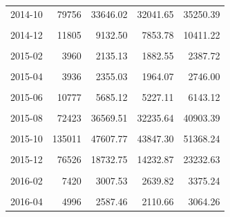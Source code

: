 \begin{longtable}[t]{crrrr}
2014-10 & 79756 & 33646.02 & 32041.65 & 35250.39\\
\cellcolor{gray!10}{2014-11} & \cellcolor{gray!10}{19109} & \cellcolor{gray!10}{15790.36} & \cellcolor{gray!10}{14187.10} & \cellcolor{gray!10}{17393.61}\\
2014-12 & 11805 & 9132.50 & 7853.78 & 10411.22\\
\cellcolor{gray!10}{2015-01} & \cellcolor{gray!10}{7028} & \cellcolor{gray!10}{3555.78} & \cellcolor{gray!10}{3184.70} & \cellcolor{gray!10}{3926.85}\\
2015-02 & 3960 & 2135.13 & 1882.55 & 2387.72\\
\cellcolor{gray!10}{2015-03} & \cellcolor{gray!10}{2659} & \cellcolor{gray!10}{2145.71} & \cellcolor{gray!10}{1827.36} & \cellcolor{gray!10}{2464.05}\\
2015-04 & 3936 & 2355.03 & 1964.07 & 2746.00\\
\cellcolor{gray!10}{2015-05} & \cellcolor{gray!10}{3468} & \cellcolor{gray!10}{2148.80} & \cellcolor{gray!10}{1655.69} & \cellcolor{gray!10}{2641.91}\\
2015-06 & 10777 & 5685.12 & 5227.11 & 6143.12\\
\cellcolor{gray!10}{2015-07} & \cellcolor{gray!10}{15874} & \cellcolor{gray!10}{11247.39} & \cellcolor{gray!10}{7949.96} & \cellcolor{gray!10}{14544.82}\\
2015-08 & 72423 & 36569.51 & 32235.64 & 40903.39\\
\cellcolor{gray!10}{2015-09} & \cellcolor{gray!10}{137635} & \cellcolor{gray!10}{54812.79} & \cellcolor{gray!10}{52551.36} & \cellcolor{gray!10}{57074.21}\\
2015-10 & 135011 & 47607.77 & 43847.30 & 51368.24\\
\cellcolor{gray!10}{2015-11} & \cellcolor{gray!10}{77664} & \cellcolor{gray!10}{27907.21} & \cellcolor{gray!10}{24606.87} & \cellcolor{gray!10}{31207.54}\\
2015-12 & 76526 & 18732.75 & 14232.87 & 23232.63\\
\cellcolor{gray!10}{2016-01} & \cellcolor{gray!10}{20977} & \cellcolor{gray!10}{6163.04} & \cellcolor{gray!10}{4934.09} & \cellcolor{gray!10}{7391.98}\\
2016-02 & 7420 & 3007.53 & 2639.82 & 3375.24\\
\cellcolor{gray!10}{2016-03} & \cellcolor{gray!10}{12019} & \cellcolor{gray!10}{3911.92} & \cellcolor{gray!10}{3544.13} & \cellcolor{gray!10}{4279.71}\\
2016-04 & 4996 & 2587.46 & 2110.66 & 3064.26\\

\end{longtable}
